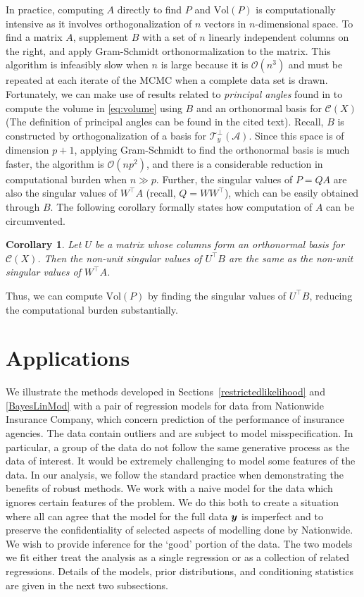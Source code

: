 \documentclass[11pt]{article}
\newcommand{\by}{\mbox{\boldmath $y$}}
\newcommand{\mc}{\mathcal}
\newtheorem{corollary}[theorem]{\bf Corollary}
\begin{document}
In practice, computing $A$ directly to find $P$ and $\text{Vol} (P)$ is computationally intensive as it involves orthogonalization of $n$ vectors in $n$-dimensional space. 
To find a matrix $A$, supplement $B$ with a set of $n$ linearly independent columns on the right, and apply Gram-Schmidt 
orthonormalization to the matrix.  This algorithm is infeasibly slow when $n$ is large because it is $\mc O(n^3)$ and must be repeated at each
iterate of the MCMC when a complete data set is drawn.  
Fortunately, we can make use of results related to \textit{principal angles} found in \cite{miao1992} to compute the volume in \eqref{eq:volume} using $B$ and an orthonormal basis for $\mc C (X)$ (The definition of principal angles can be found in the cited text). Recall, $B$ is constructed by orthogonalization of a basis for $\mc T_{y}^\perp(\mc A)$. Since this space is of dimension $p+1$, applying Gram-Schmidt to find the orthonormal basis is much faster, the algorithm is $\mc O(np^2)$, and there is a 
considerable reduction in computational burden when $n \gg p$. 
Further, the singular values of $P=QA$ are also the singular values of
$W^\top A$ (recall, $Q=WW^{\top}$), which can be easily obtained through $B$.
The following corollary formally states how computation of $A$ can be circumvented. 
\begin{corollary}
\label{theorem:sings}
Let $U$ be a matrix whose columns
form an orthonormal basis for $\mc C (X)$. Then the non-unit singular
values of $U^\top B$ are the same as the non-unit singular values of $W^\top A$.  
\end{corollary} 
\noindent Thus, we can compute $\text{Vol} (P)$ by finding the singular values of $U^\top B$, reducing the computational burden substantially. 

%
%
\section{Applications}
\label{Applications}
We illustrate the methods developed in Sections~\ref{restrictedlikelihood} and \ref{BayesLinMod} with a pair of regression models for 
data from Nationwide Insurance Company, which concern prediction of
the performance of insurance agencies.
The data contain outliers and are subject to model misspecification.  
In particular, a group of the data do not follow the same generative process as the data of interest.  It would be 
extremely challenging to model some features of the data.  
In our analysis, we follow the standard practice when demonstrating the benefits of robust 
methods.  We work with a naive model for the data which ignores certain features of the problem.  We
do this both to create a situation where all can agree that the model for the full data $\by$ is imperfect
and to preserve the confidentiality of selected aspects of modelling done by Nationwide.  
We wish to provide inference for the `good' portion of the data.  The two models we fit either treat the analysis
as a single regression or as a collection of related regressions.  Details of the models, prior distributions, 
and conditioning statistics are given in the next two subsections.  
\end{document}
